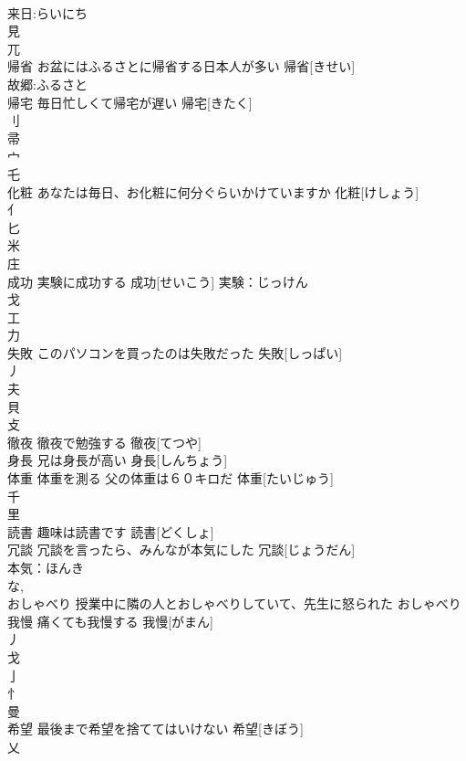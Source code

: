 \documentclass[8pt]{extreport}
\begin{document}
\begin{CJK}{UTF8}{min}
\\	来日:らいにち
\\	見 
\\	兀 
\\	帰省	お盆にはふるさとに帰省する日本人が多い	帰省[きせい]			
\\	故郷:ふるさと
\\	帰宅	毎日忙しくて帰宅が遅い	帰宅[きたく]			
\\	刂 
\\	帚 
\\	宀 
\\	乇	
\\	化粧	あなたは毎日、お化粧に何分ぐらいかけていますか	化粧[けしょう]			
\\	亻 
\\	匕 
\\	米 
\\	庄 
\\	成功	実験に成功する	成功[せいこう]			実験：じっけん
\\	戈 
\\	工 
\\	力 
\\	失敗	このパソコンを買ったのは失敗だった	失敗[しっぱい]			
\\	丿 
\\	夫 
\\	貝 
\\	攴 
\\	徹夜	徹夜で勉強する	徹夜[てつや]			
\\	身長	兄は身長が高い	身長[しんちょう]			
\\	体重	体重を測る 父の体重は６０キロだ	体重[たいじゅう]			
\\	千 
\\	里 
\\	読書	趣味は読書です	読書[どくしょ]			
\\	冗談	冗談を言ったら、みんなが本気にした	冗談[じょうだん]			
\\	本気：ほんき
\\	な, 
\\	おしゃべり	授業中に隣の人とおしゃべりしていて、先生に怒られた	おしゃべり			
\\	我慢	痛くても我慢する	我慢[がまん]			
\\	丿 
\\	戈 
\\	亅 
\\	忄 
\\	曼 
\\	希望	最後まで希望を捨ててはいけない	希望[きぼう]			
\\	乂 

\end{CJK}
\end{document}
